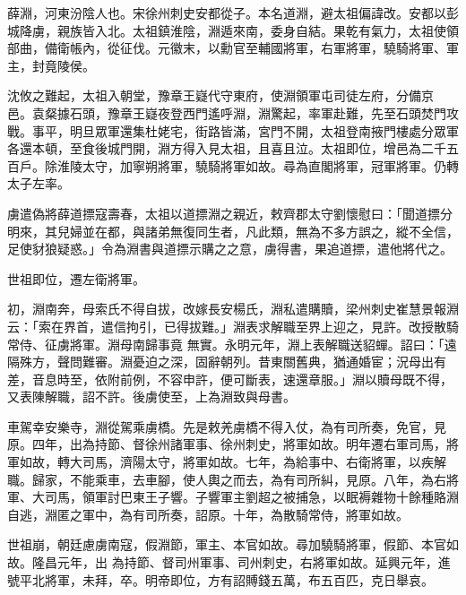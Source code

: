 
\begin{pinyinscope}

 薛淵，河東汾陰人也。宋徐州刺史安都從子。本名道淵，避太祖偏諱改。安都以彭城降虜，親族皆入北。太祖鎮淮陰，淵遁來南，委身自結。果乾有氣力，太祖使領部曲，備衛帳內，從征伐。元徽末，以勳官至輔國將軍，右軍將軍，驍騎將軍、軍主，封竟陵侯。



 沈攸之難起，太祖入朝堂，豫章王嶷代守東府，使淵領軍屯司徒左府，分備京
 邑。袁粲據石頭，豫章王嶷夜登西門遙呼淵，淵驚起，率軍赴難，先至石頭焚門攻戰。事平，明旦眾軍還集杜姥宅，街路皆滿，宮門不開，太祖登南掖門樓處分眾軍各還本頓，至食後城門開，淵方得入見太祖，且喜且泣。太祖即位，增邑為二千五百戶。除淮陵太守，加寧朔將軍，驍騎將軍如故。尋為直閣將軍，冠軍將軍。仍轉太子左率。



 虜遣偽將薛道摽寇壽春，太祖以道摽淵之親近，敕齊郡太守劉懷慰曰：「聞道摽分明來，其兒婦並在都，與諸弟無復同生者，凡此類，無為不多方誤之，縱不全信，足使豺狼疑惑。」令為淵書與道摽示購之之意，虜得書，果追道摽，遣他將代之。



 世祖即位，遷左衛將軍。



 初，淵南奔，母索氏不得自拔，改嫁長安楊氏，淵私遣購贖，梁州刺史崔慧景報淵云：「索在界首，遣信拘引，已得拔難。」淵表求解職至界上迎之，見許。改授散騎常侍、征虜將軍。淵母南歸事竟
 無實。永明元年，淵上表解職送貂蟬。詔曰：「遠隔殊方，聲問難審。淵憂迫之深，固辭朝列。昔東關舊典，猶通婚宦；況母出有差，音息時至，依附前例，不容申許，便可斷表，速還章服。」淵以贖母既不得，又表陳解職，詔不許。後虜使至，上為淵致與母書。



 車駕幸安樂寺，淵從駕乘虜橋。先是敕羌虜橋不得入仗，為有司所奏，免官，見原。四年，出為持節、督徐州諸軍事、徐州刺史，將軍如故。明年遷右軍司馬，將軍如故，轉大司馬，濟陽太守，將軍如故。七年，為給事中、右衛將軍，以疾解職。歸家，不能乘車，去車腳，使人輿之而去，為有司所糾，見原。八年，為右將軍、大司馬，領軍討巴東王子響。子響軍主劉超之被捕急，以眠褥雜物十餘種賂淵自逃，淵匿之軍中，為有司所奏，詔原。十年，為散騎常侍，將軍如故。



 世祖崩，朝廷慮虜南寇，假淵節，軍主、本官如故。尋加驍騎將軍，假節、本官如故。隆昌元年，出
 為持節、督司州軍事、司州刺史，右將軍如故。延興元年，進號平北將軍，未拜，卒。明帝即位，方有詔賻錢五萬，布五百匹，克日舉哀。




\end{pinyinscope}
